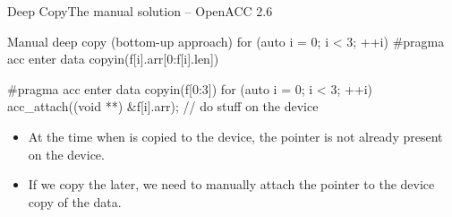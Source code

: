 \documentclass[12pt,aspectratio=169]{beamer}
\begin{document}
\begin{frame}[fragile]{Deep Copy}{The manual solution -- OpenACC 2.6}
  \vspace{.5\baselineskip}
  \begin{Cpplisting}{Manual deep copy (bottom-up approach)}
for (auto i = 0; i < 3; ++i) {
    #pragma acc enter data copyin(f[i].arr[0:f[i].len])
}

#pragma acc enter data copyin(f[0:3])
for (auto i = 0; i < 3; ++i) {
    acc_attach((void **) &f[i].arr);
}
// do stuff on the device
  \end{Cpplisting}
  \begin{itemize}
  \item At the time when  is copied to the device, the pointer is not already present on the device.
  \item If we copy the  later, we need to manually attach the pointer to the device copy of the data.
  \end{itemize}
\end{frame}

\end{document}
